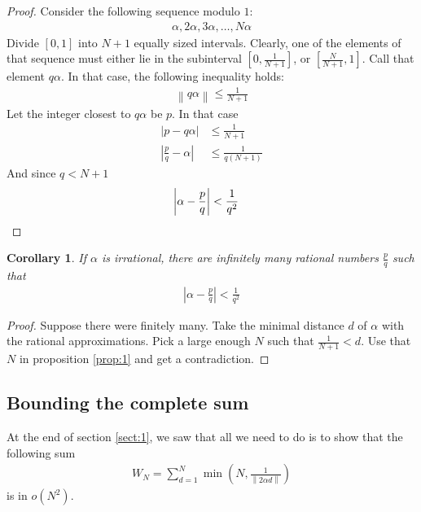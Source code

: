 \documentclass[12pt]{article}
\newtheorem{cor}[thm]{Corollary}
\theoremstyle{definition}
\newcommand{\norm}[1]{\left\lVert#1\right\rVert}
\begin{document}
\begin{proof}
    Consider the following sequence modulo $1$:
    \begin{align*}
        \alpha, 2\alpha, 3\alpha, \ldots, N\alpha
    \end{align*}
    Divide $[0,1]$ into $N+1$ equally sized intervals. Clearly, one of the elements of that sequence must either lie in the subinterval $\left[ 0, \frac{1}{N+1} \right]$, or $\left[ \frac{N}{N+1}, 1 \right]$. Call that element $q\alpha$. In that case, the following inequality holds:
    \begin{align*}
        \norm{q\alpha} \leq \frac{1}{N+1}
    \end{align*}
    Let the integer closest to $q\alpha$ be $p$. In that case
    \begin{align*}
        \left| p - q\alpha \right| &\leq \frac{1}{N+1} \\
        \left| \frac{p}{q} - \alpha \right| &\leq \frac{1}{q(N+1)}
    \end{align*}
    And since $q < N+1$
    \begin{align*}
        \left| \alpha - \frac{p}{q} \right| < \frac{1}{q^2} &\qedhere
    \end{align*}
\end{proof}

\begin{cor}
    If $\alpha$ is irrational, there are infinitely many rational numbers $\frac{p}{q}$ such that
    \begin{align*}
        \left| \alpha - \frac{p}{q} \right| < \frac{1}{q^2}
    \end{align*}
\end{cor}

\begin{proof}
    Suppose there were finitely many. Take the minimal distance $d$ of $\alpha$ with the rational approximations. Pick a large enough $N$ such that $\frac{1}{N+1} < d$. Use that $N$ in proposition \ref{prop:1} and get a contradiction.
\end{proof}

\subsection{Bounding the complete sum\cite{weyl}}
At the end of section \ref{sect:1}, we saw that all we need to do is to show that the following sum
\begin{align*}
    W_N = \sum_{d=1}^{N} \min\left( N, \frac{1}{\norm{2\alpha d}} \right)
\end{align*}
is in $o(N^2)$.
\end{document}
